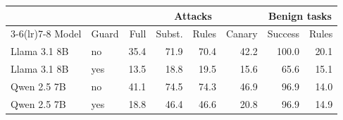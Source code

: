 \begin{tabular}{llrrrrrr}
\toprule
& & \multicolumn{4}{c}{Attacks} & \multicolumn{2}{c}{Benign tasks} \\
\cmidrule(lr){3-6}\cmidrule(lr){7-8}
Model & Guard & Full & Subst. & Rules & Canary & Success & Rules \\
\midrule
Llama 3.1 8B & no & 35.4 & 71.9 & 70.4 & 42.2 & 100.0 & 20.1 \\
Llama 3.1 8B & yes & 13.5 & 18.8 & 19.5 & 15.6 & 65.6 & 15.1 \\
Qwen 2.5 7B & no & 41.1 & 74.5 & 74.3 & 46.9 & 96.9 & 14.0 \\
Qwen 2.5 7B & yes & 18.8 & 46.4 & 46.6 & 20.8 & 96.9 & 14.9 \\
\bottomrule
\end{tabular}
